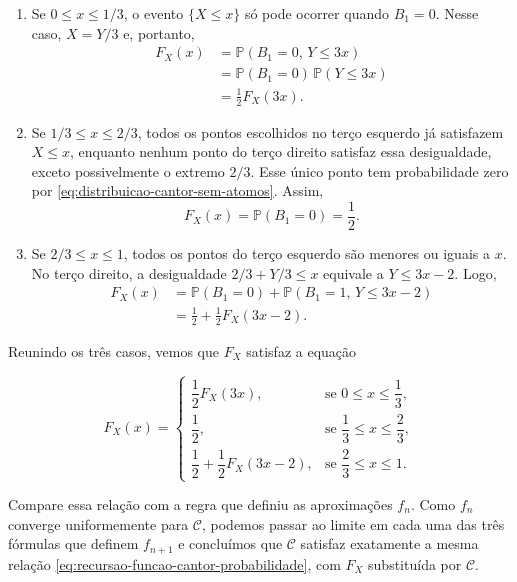\documentclass[12pt,portuguese]{article}
\theoremstyle{definition}
\theoremstyle{plainexercise}
\theoremstyle{starredexercise}
\theoremstyle{definition}
\begin{document}
\begin{enumerate}[label=\textup{\roman*)}]
  \item Se $0\leqslant x\leqslant 1/3$, o evento $\{X\leqslant x\}$ só pode
  ocorrer quando $B_1=0$. Nesse caso, $X=Y/3$ e, portanto,
  \begin{align*}
    F_X(x)
      &=\mathbb{P}(B_1=0,\,Y\leqslant 3x)\\[0.3cm]
      &=\mathbb{P}(B_1=0)\,\mathbb{P}(Y\leqslant 3x)\\[0.3cm]
      &=\frac{1}{2}F_X(3x).
  \end{align*}

  \item Se $1/3\leqslant x\leqslant 2/3$, todos os pontos escolhidos no
  terço esquerdo já satisfazem $X\leqslant x$, enquanto nenhum ponto do
  terço direito satisfaz essa desigualdade, exceto possivelmente o extremo
  $2/3$. Esse único ponto tem probabilidade zero por
  \eqref{eq:distribuicao-cantor-sem-atomos}. Assim,
  \[
    F_X(x)=\mathbb{P}(B_1=0)=\frac{1}{2}.
  \]

  \item Se $2/3\leqslant x\leqslant 1$, todos os pontos do terço esquerdo
  são menores ou iguais a $x$. No terço direito, a desigualdade
  \(2/3+Y/3\leqslant x\) equivale a $Y\leqslant 3x-2$. Logo,
  \begin{align*}
    F_X(x)
      &=\mathbb{P}(B_1=0)
        +\mathbb{P}(B_1=1,\,Y\leqslant 3x-2)\\
      &=\frac{1}{2}+\frac{1}{2}F_X(3x-2).
  \end{align*}
\end{enumerate}

Reunindo os três casos, vemos que $F_X$ satisfaz a equação

\begin{equation}\label{eq:recursao-funcao-cantor-probabilidade}
F_X(x)=
\begin{cases}
\dfrac{1}{2}F_X(3x),
  & \text{se }0\leqslant x\leqslant \dfrac{1}{3},\\[0.5cm]
\dfrac{1}{2},
  & \text{se }\dfrac{1}{3}\leqslant x\leqslant \dfrac{2}{3},\\[0.5cm]
\dfrac{1}{2}+\dfrac{1}{2}F_X(3x-2),
  & \text{se }\dfrac{2}{3}\leqslant x\leqslant 1.
\end{cases}
\end{equation}

Compare essa relação com a regra que definiu as aproximações $f_n$. Como
$f_n$ converge uniformemente para $\mathcal{C}$, podemos passar ao limite em
cada uma das três fórmulas que definem $f_{n+1}$ e concluímos que
$\mathcal{C}$ satisfaz exatamente a mesma relação \eqref{eq:recursao-funcao-cantor-probabilidade},
com $F_X$ substituída por $\mathcal{C}$.
\end{document}
